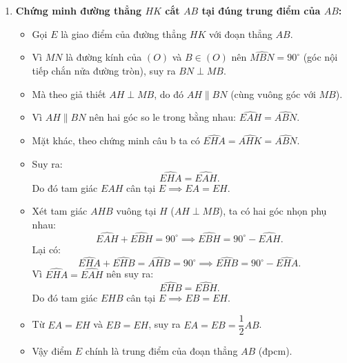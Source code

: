 \begin{ex}
{\begin{enumerate}[label=\textbf{\alph*)}]
    \item \textbf{Chứng minh đường thẳng $HK$ cắt $AB$ tại đúng trung điểm của $AB$:}
    \begin{itemize}
        \item Gọi $E$ là giao điểm của đường thẳng $HK$ với đoạn thẳng $AB$.
        \item Vì $MN$ là đường kính của $(O)$ và $B \in (O)$ nên $\widehat{MBN} = 90^\circ$ (góc nội tiếp chắn nửa đường tròn), suy ra $BN \perp MB$.
        \item Mà theo giả thiết $AH \perp MB$, do đó $AH \parallel BN$ (cùng vuông góc với $MB$).
        \item Vì $AH \parallel BN$ nên hai góc so le trong bằng nhau: $\widehat{EAH} = \widehat{ABN}$.
        \item Mặt khác, theo chứng minh câu b ta có $\widehat{EHA} = \widehat{AHK} = \widehat{ABN}$.
        \item Suy ra:
        \[
        \widehat{EHA} = \widehat{EAH}.
        \]
        Do đó tam giác $EAH$ cân tại $E \implies EA = EH$.
        \item Xét tam giác $AHB$ vuông tại $H$ ($AH \perp MB$), ta có hai góc nhọn phụ nhau:
        \[
        \widehat{EAH} + \widehat{EBH} = 90^\circ \implies \widehat{EBH} = 90^\circ - \widehat{EAH}.
        \]
        Lại có:
        \[
        \widehat{EHA} + \widehat{EHB} = \widehat{AHB} = 90^\circ \implies \widehat{EHB} = 90^\circ - \widehat{EHA}.
        \]
        Vì $\widehat{EHA} = \widehat{EAH}$ nên suy ra:
        \[
        \widehat{EHB} = \widehat{EBH}.
        \]
        Do đó tam giác $EHB$ cân tại $E \implies EB = EH$.
        \item Từ $EA = EH$ và $EB = EH$, suy ra $EA = EB = \dfrac{1}{2}AB$.
        \item Vậy điểm $E$ chính là trung điểm của đoạn thẳng $AB$ (đpcm).
    \end{itemize}
\end{enumerate}
}
\end{ex}
